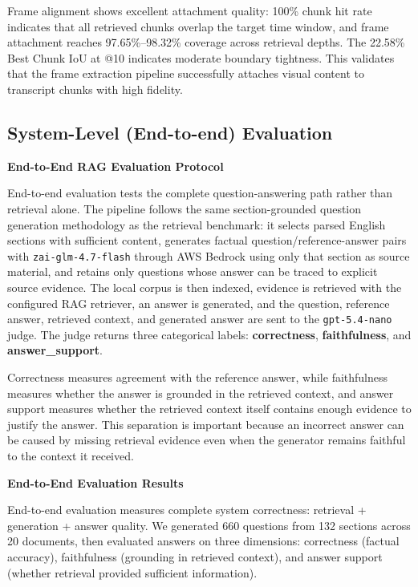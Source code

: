 Frame alignment shows excellent attachment quality: 100\% chunk hit rate indicates that all retrieved chunks overlap the target time window, and frame attachment reaches 97.65\%--98.32\% coverage across retrieval depths. The 22.58\% Best Chunk IoU at @10 indicates moderate boundary tightness. This validates that the frame extraction pipeline successfully attaches visual content to transcript chunks with high fidelity.

\subsection{System-Level (End-to-end) Evaluation}

\textbf{End-to-End RAG Evaluation Protocol}

End-to-end evaluation tests the complete question-answering path rather than retrieval alone. The pipeline follows the same section-grounded question generation methodology as the retrieval benchmark: it selects parsed English sections with sufficient content, generates factual question/reference-answer pairs with \texttt{zai-glm-4.7-flash} through AWS Bedrock using only that section as source material, and retains only questions whose answer can be traced to explicit source evidence. The local corpus is then indexed, evidence is retrieved with the configured RAG retriever, an answer is generated, and the question, reference answer, retrieved context, and generated answer are sent to the \texttt{gpt-5.4-nano} judge. The judge returns three categorical labels: \textbf{correctness}, \textbf{faithfulness}, and \textbf{answer\_support}.

Correctness measures agreement with the reference answer, while faithfulness measures whether the answer is grounded in the retrieved context, and answer support measures whether the retrieved context itself contains enough evidence to justify the answer. This separation is important because an incorrect answer can be caused by missing retrieval evidence even when the generator remains faithful to the context it received.

\textbf{End-to-End Evaluation Results}

End-to-end evaluation measures complete system correctness: retrieval + generation + answer quality. We generated 660 questions from 132 sections across 20 documents, then evaluated answers on three dimensions: correctness (factual accuracy), faithfulness (grounding in retrieved context), and answer support (whether retrieval provided sufficient information).

